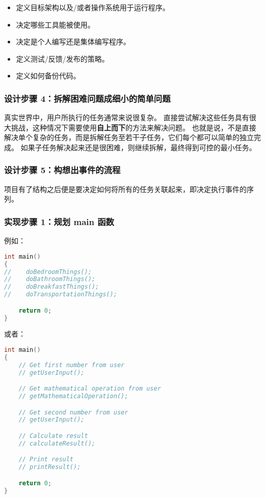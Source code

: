 \documentclass[../../LearnCpp.tex]{subfiles}
\begin{document}
\begin{itemize}
    \item 定义目标架构以及/或者操作系统用于运行程序。
    \item 决定哪些工具能被使用。
    \item 决定是个人编写还是集体编写程序。
    \item 定义测试/反馈/发布的策略。
    \item 定义如何备份代码。
\end{itemize}

\subsubsection*{设计步骤 4：拆解困难问题成细小的简单问题}

真实世界中，用户所执行的任务通常来说很复杂。
直接尝试解决这些任务具有很大挑战，这种情况下需要使用\textbf{自上而下}的方法来解决问题。
也就是说，不是直接解决单个复杂的任务，而是拆解任务至若干子任务，它们每个都可以简单的独立完成。
如果子任务解决起来还是很困难，则继续拆解，最终得到可控的最小任务。

\subsubsection*{设计步骤 5：构想出事件的流程}

项目有了结构之后便是要决定如何将所有的任务关联起来，即决定执行事件的序列。

\subsubsection*{实现步骤 1：规划 main 函数}

例如：

\begin{lstlisting}[language=C++]
int main()
{
//    doBedroomThings();
//    doBathroomThings();
//    doBreakfastThings();
//    doTransportationThings();

    return 0;
}
\end{lstlisting}

或者：

\begin{lstlisting}[language=C++]
int main()
{
    // Get first number from user
    // getUserInput();

    // Get mathematical operation from user
    // getMathematicalOperation();

    // Get second number from user
    // getUserInput();

    // Calculate result
    // calculateResult();

    // Print result
    // printResult();

    return 0;
}
\end{lstlisting}
\end{document}

